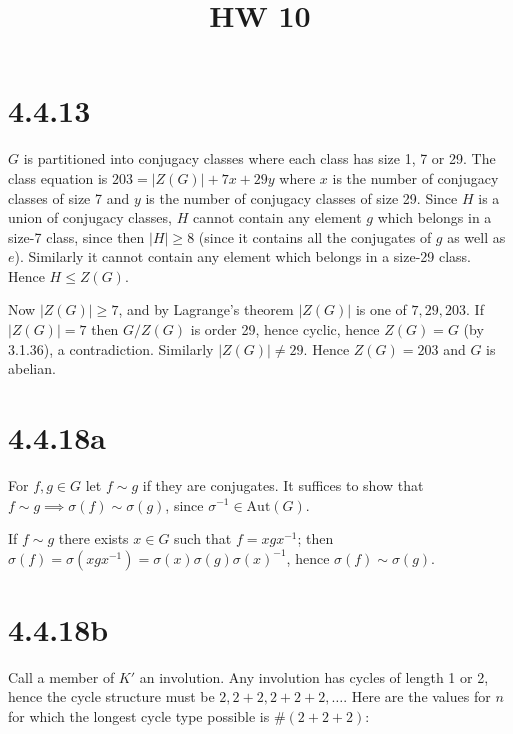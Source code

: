 \documentclass{article}
\title{HW 10}
\date{}
\def\inv{{-1}}
\def\Aut{\textrm{Aut}}
\begin{document}
\maketitle






\section*{4.4.13}

$G$ is partitioned into conjugacy classes where each class has size 1, 7 or 29. The class equation is $203 = |Z(G)| + 7x + 29y$ where $x$ is the number of conjugacy classes of size 7 and $y$ is the number of conjugacy classes of size 29. Since $H$ is a union of conjugacy classes, $H$ cannot contain any element $g$ which belongs in a size-7 class, since then $|H| \ge 8$ (since it contains all the conjugates of $g$ as well as $e$). Similarly it cannot contain any element which belongs in a size-29 class. Hence $H \le Z(G)$.

Now $|Z(G)| \ge 7$, and by Lagrange's theorem $|Z(G)|$ is one of $7, 29, 203$. If $|Z(G)| = 7$ then $G / Z(G)$ is order 29, hence cyclic, hence $Z(G) = G$ (by 3.1.36), a contradiction. Similarly $|Z(G)| \ne 29$. Hence $Z(G) = 203$ and $G$ is abelian.

\section*{4.4.18a}

For $f, g \in G$ let $f \sim g$ if they are conjugates. It suffices to show that $f \sim g \implies \sigma(f) \sim \sigma(g)$, since $\sigma^\inv \in \Aut(G)$.

If $f \sim g$ there exists $x \in G$ such that $f = xgx^\inv$; then $\sigma(f) = \sigma(xgx^\inv) = \sigma(x)\sigma(g)\sigma(x)^\inv$, hence $\sigma(f) \sim \sigma(g)$.

\section*{4.4.18b}

Call a member of $K'$ an involution. Any involution has cycles of length 1 or 2, hence the cycle structure must be $2, 2+2, 2+2+2, \ldots$. Here are the values for $n$ for which the longest cycle type possible is $\#(2+2+2)$:
\end{document}
